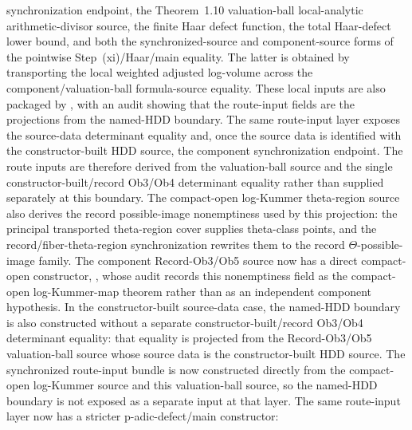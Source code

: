 \begin{proposition}
  synchronization endpoint, the Theorem~1.10 valuation-ball local-analytic
  arithmetic-divisor source, the finite Haar defect function, the total
  Haar-defect lower bound, and both the synchronized-source and
  component-source forms of the pointwise Step~(xi)/Haar/main equality.  The
  latter is obtained by transporting the local weighted adjusted log-volume
  across the component/valuation-ball formula-source equality.  These local
  inputs are also packaged by
  ,
  with an audit showing that the route-input fields are the projections from
  the named-HDD boundary.  The same route-input layer exposes the source-data
  determinant equality and, once the source data is identified with the
  constructor-built HDD source, the component synchronization endpoint.  The
  route inputs are therefore derived from the valuation-ball source and the
  single constructor-built/record Ob3/Ob4 determinant equality rather than
  supplied separately at this boundary.  The compact-open log-Kummer
  theta-region source also derives the record possible-image nonemptiness used
  by this projection: the principal transported theta-region cover supplies
  theta-class points, and the record/fiber-theta-region synchronization
  rewrites them to the record \(\Theta\)-possible-image family.  The component
  Record-Ob3/Ob5 source now has a direct compact-open constructor,
  ,
  whose audit records this nonemptiness field as the compact-open
  log-Kummer-map theorem rather than as an independent component hypothesis.  In the
  constructor-built source-data case, the named-HDD boundary is also
  constructed without a separate constructor-built/record Ob3/Ob4 determinant
  equality: that equality is projected from the Record-Ob3/Ob5 valuation-ball
  source whose source data is the constructor-built HDD source.  The
  synchronized route-input bundle is now constructed directly from the
  compact-open log-Kummer source and this valuation-ball source, so the
  named-HDD boundary is not exposed as a separate input at that layer.
  The same route-input layer now has a stricter p-adic-defect/main constructor:

\end{proposition}
